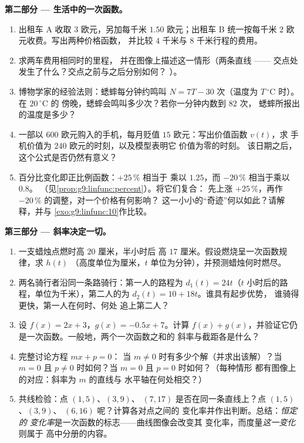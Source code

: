 \begin{problem}
\medskip
\noindent\textbf{第二部分 --- 生活中的一次函数。}
\begin{enumerate}[resume]
  \item 出租车 A 收取 $3$ 欧元，另加每千米 $1.50$ 欧元；出租车 B
        统一按每千米 $2$ 欧元收费。写出两种价格函数，
        并比较 $4$ 千米与
        $8$ 千米行程的费用。
  \item 求两车费用相同时的里程，
        并在图像上描述这一情形（两条直线 ——
        交点处发生了什么？交点之前与之后分别如何？
        ）。
  \item 博物学家的经验法则：蟋蟀每分钟约鸣叫
        $N = 7T - 30$ 次（温度为
        $T\,^\circ$C 时）。在 $20\,^\circ$C 的
        傍晚，蟋蟀会鸣叫多少次？若你一分钟内数到 $82$ 次，
        蟋蟀所报出的温度是多少？
  \item 一部以 $600$ 欧元购入的手机，每月贬值
        $15$ 欧元：写出价值函数 $v(t)$，求
        手机价值为 $240$ 欧元的时刻，以及模型表明它
        价值为零的时刻。
        该日期之后，这个公式是否仍然有意义？
  \item 百分比变化即正比例函数：$+25\,\%$ 相当于
        乘以 $1.25$，而 $-20\,\%$ 相当于乘以 $0.8$。
        （见\cref{prop:g9:linfunc:percent}）。将它们复合：
        先上涨 $+25\,\%$，再作 $-20\,\%$ 的调整，对一个价格有何影响？
        这一小小的“奇迹”何以如此？请解释，并与
        \cref{exo:g9:linfunc:10}作比较。
\end{enumerate}

\medskip
\noindent\textbf{第三部分 --- 斜率决定一切。}
\begin{enumerate}[resume]
  \item 一支蜡烛点燃时高 $20$ 厘米，半小时后
        高 $17$ 厘米。假设燃烧呈一次函数规律，求 $h(t)$
        （高度单位为厘米，$t$ 单位为分钟），并预测蜡烛何时燃尽。
  \item 两名骑行者沿同一条路骑行：第一人的路程为
        $d_1(t) = 24t$（$t$ 小时后的路程，单位为千米），第二人的为
        $d_2(t) = 10 + 18t$。谁具有起步优势，
        谁骑得更快，第一人在何时、何处
        追上第二人？
  \item 设 $f(x) = 2x + 3$，$g(x) = -0.5x + 7$。计算
        $f(x) + g(x)$，并验证它仍是一次函数。一般地，两个一次函数之和的
        斜率与截距各是什么？
  \item 完整讨论方程 $mx + p = 0$：
        当 $m \neq 0$ 时有多少个解（并求出该解）？当 $m = 0$
        且 $p \neq 0$ 时如何？当 $m = 0$ 且 $p = 0$ 时如何？（每种情形
        都有图像上的对应：斜率为 $m$ 的直线与
        水平轴在何处相交？）
  \item 共线检验：点 $(1, 5)$、$(3, 9)$、
        $(7, 17)$ 是否在同一条直线上？点 $(1, 5)$、$(3, 9)$、
        $(6, 16)$ 呢？计算各对点之间的
        变化率并作出判断。总结：\emph{恒定的
        变化率}是一次函数的标志——曲线图像会改变其
        变化率，而度量\emph{这一变化}则属于
        高中分册的内容。
\end{enumerate}
\end{problem}
